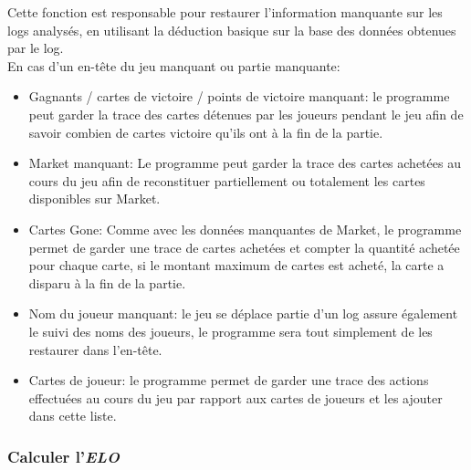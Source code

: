 Cette fonction est responsable pour restaurer l'information manquante sur les logs analysés, en utilisant la déduction basique sur la base des données obtenues par le log.\\
En cas d'un en-tête du jeu manquant ou partie manquante:
  \begin{itemize}
\item Gagnants / cartes de victoire / points de victoire manquant: le programme peut garder la trace des cartes détenues par les joueurs pendant le jeu afin de savoir combien de cartes victoire qu'ils ont à la fin de la partie.
\item Market manquant: Le programme peut garder la trace des cartes achetées au cours du jeu afin de reconstituer partiellement ou totalement les cartes disponibles sur Market.
\item Cartes Gone: Comme avec les données manquantes de Market, le programme permet de garder une trace de cartes achetées et compter la quantité achetée pour chaque carte, si le montant maximum de cartes est acheté, la carte a disparu à la fin de la partie.
\item Nom du joueur manquant: le jeu se déplace partie d'un log assure également le suivi des noms des joueurs, le programme sera tout simplement de les restaurer dans l'en-tête.
\item Cartes de joueur: le programme permet de garder une trace des actions effectuées au cours du jeu par rapport aux cartes de joueurs et les ajouter dans cette liste.
  \end{itemize}

\subsubsection{Calculer l'\textit{\textbf{ELO}}}
